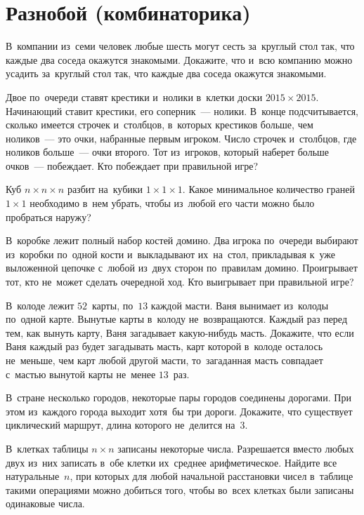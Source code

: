 
\section*{Разнобой (комбинаторика)}


\begin{problems}

\item
В~компании из~семи человек любые шесть могут сесть за~круглый стол так, что
каждые два соседа окажутся знакомыми.
Докажите, что и~всю компанию можно усадить за~круглый стол так, что каждые два
соседа окажутся знакомыми.

\item
Двое по~очереди ставят крестики и~нолики в~клетки доски $2015 \times 2015$.
Начинающий ставит крестики, его соперник~--- нолики.
В~конце подсчитывается, сколько имеется строчек и~столбцов, в~которых крестиков
больше, чем ноликов~--- это очки, набранные первым игроком.
Число строчек и~столбцов, где ноликов больше~--- очки второго.
Тот из~игроков, который наберет больше очков~--- побеждает.
Кто побеждает при правильной игре?

\item
Куб $n \times n \times n$ разбит на~кубики $1 \times 1 \times 1$.
Какое минимальное количество граней $1 \times 1$ необходимо
в~нем убрать, чтобы из~любой его части можно было пробраться наружу?

\item
В~коробке лежит полный набор костей домино.
Два игрока по~очереди выбирают из~коробки по~одной кости и~выкладывают
их~на~стол, прикладывая к~уже выложенной цепочке с~любой из~двух сторон
по~правилам домино.
Проигрывает тот, кто не~может сделать очередной ход.
Кто выигрывает при правильной игре?

\item
В~колоде лежит $52$~карты, по~$13$ каждой масти.
Ваня вынимает из~колоды по~одной карте.
Вынутые карты в~колоду не~возвращаются.
Каждый раз перед тем, как вынуть карту, Ваня загадывает какую-нибудь масть.
Докажите, что если Ваня каждый раз будет загадывать масть, карт которой
в~колоде осталось не~меньше, чем карт любой другой масти, то~загаданная масть
совпадает с~мастью вынутой карты не~менее $13$~раз.

\item
В~стране несколько городов, некоторые пары городов соединены дорогами.
При этом из~каждого города выходит хотя~бы три дороги.
Докажите, что существует циклический маршрут, длина которого не~делится на~$3$.

\item
В~клетках таблицы $n \times n$ записаны некоторые числа.
Разрешается вместо любых двух из~них записать в~обе клетки их~среднее
арифметическое.
Найдите все натуральные~$n$, при которых для любой начальной расстановки чисел
в~таблице такими операциями можно добиться того, чтобы во~всех клетках были
записаны одинаковые числа.

\end{problems}

